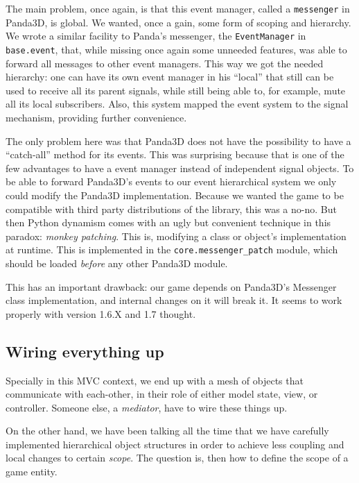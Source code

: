 \documentclass[a4paper,10pt]{article}
\begin{document}
The main problem, once again, is that this event manager, called a
\texttt{messenger} in Panda3D, is global. We wanted, once a gain, some
form of scoping and hierarchy. We wrote a similar facility to Panda's
messenger, the \texttt{EventManager} in \texttt{base.event}, that,
while missing once again some unneeded features, was able to forward
all messages to other event managers. This way we got the needed
hierarchy: one can have its own event manager in his ``local'' that
still can be used to receive all its parent signals, while still being
able to, for example, mute all its local subscribers. Also, this
system mapped the event system to the signal mechanism, providing
further convenience.

The only problem here was that Panda3D does not have the possibility
to have a ``catch-all'' method for its events. This was surprising
because that is one of the few advantages to have a event manager
instead of independent signal objects. To be able to forward Panda3D's
events to our event hierarchical system we only could modify the
Panda3D implementation. Because we wanted the game to be compatible
with third party distributions of the library, this was a no-no. But
then Python dynamism comes with an ugly but convenient technique in
this paradox: \emph{monkey patching}. This is, modifying a class or
object's implementation at runtime. This is implemented in the
\texttt{core.messenger\_patch} module, which should be loaded
\emph{before} any other Panda3D module.

This has an important drawback: our game depends on Panda3D's
Messenger class implementation, and internal changes on it will break
it. It seems to work properly with version 1.6.X and 1.7 thought.

\subsection{Wiring everything up}

Specially in this MVC context, we end up with a mesh of objects that
communicate with each-other, in their role of either model state,
view, or controller. Someone else, a \emph{mediator}\cite{gof}, have
to wire these things up.

On the other hand, we have been talking all the time that we have
carefully implemented hierarchical object structures in order to
achieve less coupling and local changes to certain \emph{scope}. The
question is, then how to define the scope of a game entity.
\end{document}
